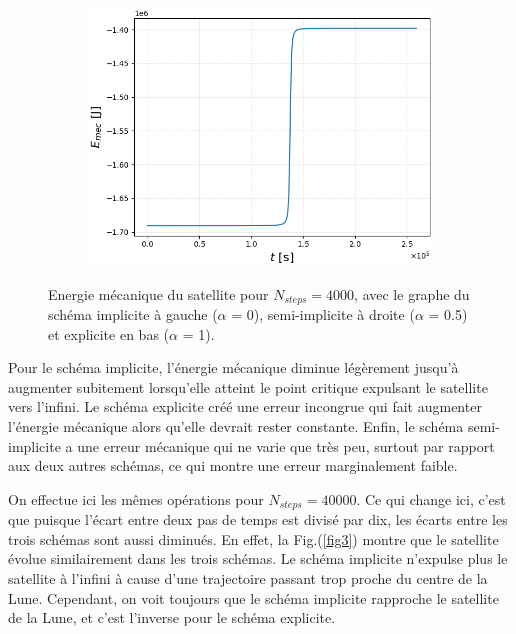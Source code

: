 \documentclass[a4paper,12pt,twoside]{article}
\begin{document}
\begin{figure}[H]
\begin{subfigure}{0.45\textwidth}
\end{subfigure}
\begin{subfigure}{0.45\textwidth}  %
    \centering  %
    \includegraphics[scale=0.4]{Graphes/E_mec_alpha_1.png}
\end{subfigure}
\captionsetup{justification=centering}
\caption{Energie mécanique du satellite pour $N_{steps} = 4000$, avec le graphe du schéma implicite à gauche ($\alpha$ = 0), semi-implicite à droite ($\alpha$ = 0.5) et explicite en bas ($\alpha$ = 1).}
\label{fig2}
\end{figure}

\vspace{-1cm}

Pour le schéma implicite, l'énergie mécanique diminue légèrement jusqu'à augmenter subitement lorsqu'elle atteint le point critique expulsant le satellite vers l'infini. Le schéma explicite créé une erreur incongrue qui fait augmenter l'énergie mécanique alors qu'elle devrait rester constante. Enfin, le schéma semi-implicite a une erreur mécanique qui ne varie que très peu, surtout par rapport  aux deux autres schémas, ce qui montre une erreur marginalement faible.

On effectue ici les mêmes opérations pour $N_{steps}=40000$. Ce qui change ici, c'est que puisque l'écart entre deux pas de temps est divisé par dix, les écarts entre les trois schémas sont aussi diminués. En effet, la Fig.(\ref{fig3}) montre que le satellite évolue  similairement dans les trois schémas. Le schéma implicite n'expulse plus le satellite à l'infini à cause d'une trajectoire passant trop proche du centre de la Lune. Cependant, on voit toujours que le schéma implicite rapproche le satellite de la Lune, et c'est l'inverse pour le schéma explicite.
\end{document}

